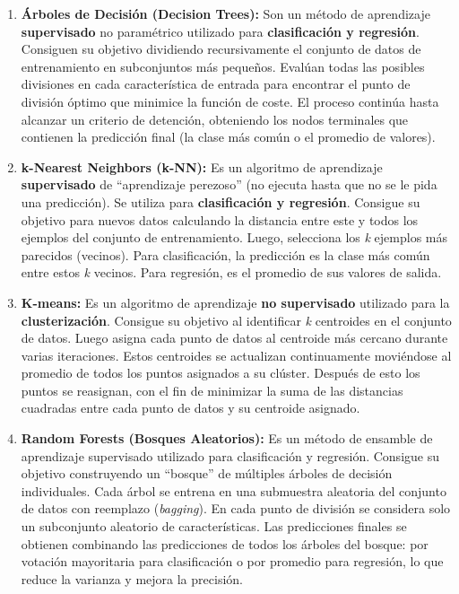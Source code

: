 \begin{enumerate}
	\begin{enumerate}
		\item \textbf{Árboles de Decisión (Decision Trees):}
		Son un método de aprendizaje \textbf{supervisado} no paramétrico utilizado para \textbf{clasificación y regresión}. Consiguen su objetivo dividiendo recursivamente el conjunto de datos de entrenamiento en subconjuntos más pequeños. Evalúan todas las posibles divisiones en cada característica de entrada para encontrar el punto de división óptimo que minimice la función de coste. El proceso continúa hasta alcanzar un criterio de detención, obteniendo los nodos terminales que contienen la predicción final (la clase más común o el promedio de valores).

		\item \textbf{k-Nearest Neighbors (k-NN):}
		Es un algoritmo de aprendizaje \textbf{supervisado} de ``aprendizaje perezoso'' (no ejecuta hasta que no se le pida una predicción). Se utiliza para \textbf{clasificación y regresión}. Consigue su objetivo para nuevos datos calculando la distancia entre este y todos los ejemplos del conjunto de entrenamiento. Luego, selecciona los \emph{k} ejemplos más parecidos (vecinos). Para clasificación, la predicción es la clase más común entre estos \emph{k} vecinos. Para regresión, es el promedio de sus valores de salida.

		\item \textbf{K-means:}
		Es un algoritmo de aprendizaje \textbf{no supervisado} utilizado para la \textbf{clusterización}. Consigue su objetivo al identificar \emph{k} centroides en el conjunto de datos. Luego asigna cada punto de datos al centroide más cercano durante varias iteraciones. Estos centroides se actualizan continuamente moviéndose al promedio de todos los puntos asignados a su clúster. Después de esto los puntos se reasignan, con el fin de minimizar la suma de las distancias cuadradas entre cada punto de datos y su centroide asignado.

		\item \textbf{Random Forests (Bosques Aleatorios):}
		Es un método de ensamble de aprendizaje supervisado utilizado para clasificación y regresión. Consigue su objetivo construyendo un ``bosque'' de múltiples árboles de decisión individuales. Cada árbol se entrena en una submuestra aleatoria del conjunto de datos con reemplazo (\textit{bagging}). En cada punto de división se considera solo un subconjunto aleatorio de características. Las predicciones finales se obtienen combinando las predicciones de todos los árboles del bosque: por votación mayoritaria para clasificación o por promedio para regresión, lo que reduce la varianza y mejora la precisión.


\end{enumerate}
\end{enumerate}

